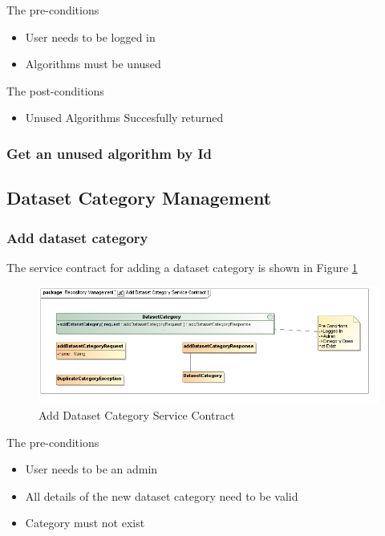 The pre-conditions
\begin{itemize}
  \item User needs to be logged in
  \item Algorithms must be unused
\end{itemize}

The post-conditions
\begin{itemize}
  \item Unused Algorithms Succesfully returned
\end{itemize}
\subsubsection {Get an unused algorithm by Id}

\subsection{Dataset Category Management}

\subsubsection {Add dataset category}
The service contract for adding a dataset category is shown in Figure \ref{fig:addDatasetCatService}
\begin{figure}[H]
  \begin{center}
  \includegraphics[scale=0.6]{../Diagrams and Charts/Test Data/Add Dataset Category Service Contract.jpg}
  \caption{Add Dataset Category Service Contract}
  \label{fig:addDatasetCatService}
  \end{center}
  
\end{figure}

The pre-conditions
\begin{itemize}
  \item User needs to be an admin
  \item All details of the new dataset category need to be valid
  \item Category must not exist
\end{itemize}

